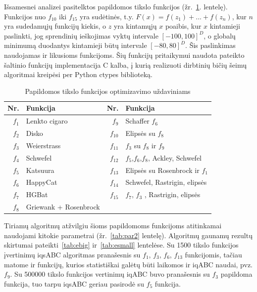 \documentclass{VUMIFKompMagistrinis}
\begin{document}
Išsamesnei analizei pasitelktos papildomos tikslo funkcijos \cite{CLZ14} (žr.~\ref{tab:extra}. lentelę). Funkcijos nuo $f_{10}$ iki $f_{15}$ yra sudėtinės, t.y. $F(x)=f(z_{1})+...+f(z_{n})$, kur $n$ yra sudedamųjų funkcijų kiekis, o $z$ yra kintamųjų $x$ poaibis, kur $x$ kintamieji paslinkti, jog sprendinių ieškojimas vyktų intervale $[-100,100]^{D}$, o globalų minimumą duodantys kintamieji būtų intervale $[-80,80]^{D}$. Šis paslinkimas naudojamas ir likusioms funkcijoms. Šių funkcijų pritaikymui naudota pateikto šaltinio \cite{CLZ14} funkcijų implementacija C kalba, į kurią realizuoti dirbtinių bičių šeimų algoritmai kreipėsi per Python ctypes biblioteką.

\begin{table}[H]
\centering
\caption{Papildomos tikslo funkcijos optimizavimo uždaviniams}
\label{tab:extra}
\begin{tabular}{r|l|r|l}
Nr.&Funk\-ci\-ja&Nr.&Funk\-ci\-ja\\
\hline
$f_{1}$ & Lenkto cigaro   &$f_{9}$ & Schaffer $f_6$\\
$f_{2}$ & Disko           &$f_{10}$ & Elipsės su $f_8$\\
$f_{3}$ & Weierstrass     &$f_{11}$ & $f_3$ su $f_8$ ir $f_9$ \\
$f_{4}$ & Schwefel        &$f_{12}$ & $f_5$,$f_6$,$f_8$, Ackley, Schwefel\\
$f_{5}$ & Katsuura       &$f_{13}$ & Elipsės su Rosenbrock ir $f_1$\\
$f_{6}$ & HappyCat      &$f_{14}$ & Schwefel, Rastrigin, elipsės\\
$f_{7}$ & HGBat       &$f_{15}$ & $f_7$, $f_3$ , Rastrigin, elipsės \\
$f_{8}$ & Griewank + Rosenbrock    &&

\end{tabular}
\end{table}


Tiriamų algoritmų atžvilgiu šioms papildomoms funkcijoms atitinkamai naudojami kitokie parametrai (žr.~\ref{tab:par2} lentelę). Algoritmų gaunamų rezultų skirtumai pateikti~\ref{tab:ebig} ir~\ref{tab:esmall} lentelėse. Su 1500 tikslo funkcijos įvertinimų iqsABC algoritmas pranašesnis su $f_{1}$, $f_{3}$, $f_{6}$, $f_{13}$ funkcijomis, tačiau matome ir funkcijų, kurios statistiškai galėtų būti laikomos ir iqABC naudai, pvz. $f_{9}$.  Su 500000 tikslo funkcijos vertinimų iqABC buvo pranašesnis su $f_{3}$ papildoma funkcija, tuo tarpu iqsABC geriau pasirodė su $f_{5}$ funkcija.
\end{document}

